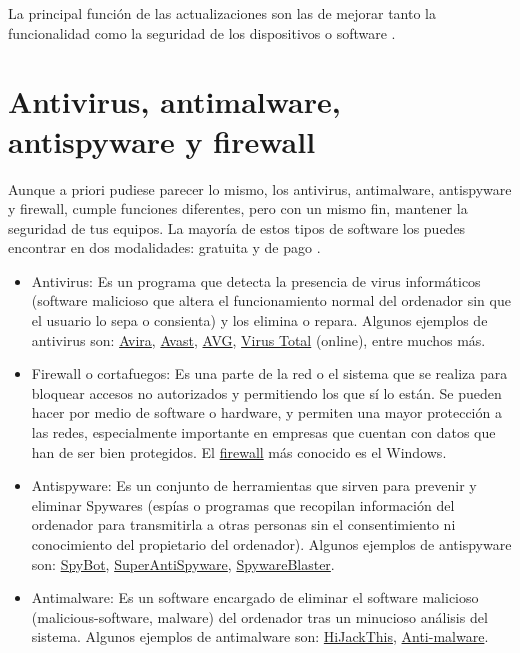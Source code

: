 \documentclass[
  a4paper,
  openany]{book}
\begin{document}
La principal función de las actualizaciones son las de mejorar tanto la funcionalidad como la seguridad de los dispositivos o software \citep{OSI-actualizaciones}.

\hypertarget{antivirus-antimalware-antispyware-y-firewall}{%
\section{Antivirus, antimalware, antispyware y firewall}\label{antivirus-antimalware-antispyware-y-firewall}}

Aunque a priori pudiese parecer lo mismo, los antivirus, antimalware, antispyware y firewall, cumple funciones diferentes, pero con un mismo fin, mantener la seguridad de tus equipos. La mayoría de estos tipos de software los puedes encontrar en dos modalidades: gratuita y de pago \citep{software-seguridad}.

\begin{itemize}
\item
  Antivirus: Es un programa que detecta la presencia de virus informáticos (software malicioso que altera el funcionamiento normal del ordenador sin que el usuario lo sepa o consienta) y los elimina o repara. Algunos ejemplos de antivirus son: \href{https://www.avira.com/es}{Avira}, \href{https://www.avast.com/es-es/index\#pc}{Avast}, \href{https://www.avg.com/es-es/homepage\#pc}{AVG}, \href{https://www.virustotal.com/gui/}{Virus Total} (online), entre muchos más.
\item
  Firewall o cortafuegos: Es una parte de la red o el sistema que se realiza para bloquear accesos no autorizados y permitiendo los que sí lo están. Se pueden hacer por medio de software o hardware, y permiten una mayor protección a las redes, especialmente importante en empresas que cuentan con datos que han de ser bien protegidos. El \href{https://en.wikipedia.org/wiki/Windows_Firewall}{firewall} más conocido es el Windows.
\item
  Antispyware: Es un conjunto de herramientas que sirven para prevenir y eliminar Spywares (espías o programas que recopilan información del ordenador para transmitirla a otras personas sin el consentimiento ni conocimiento del propietario del ordenador). Algunos ejemplos de antispyware son: \href{https://www.safer-networking.org/}{SpyBot}, \href{https://www.superantispyware.com/}{SuperAntiSpyware}, \href{https://www.brightfort.com/spywareblaster.html}{SpywareBlaster}.
\item
  Antimalware: Es un software encargado de eliminar el software malicioso (malicious-software, malware) del ordenador tras un minucioso análisis del sistema. Algunos ejemplos de antimalware son: \href{https://www.infospyware.com/antimalware/hijackthis/}{HiJackThis}, \href{https://www.malwarebytes.com/}{Anti-malware}.
\end{itemize}
\end{document}
